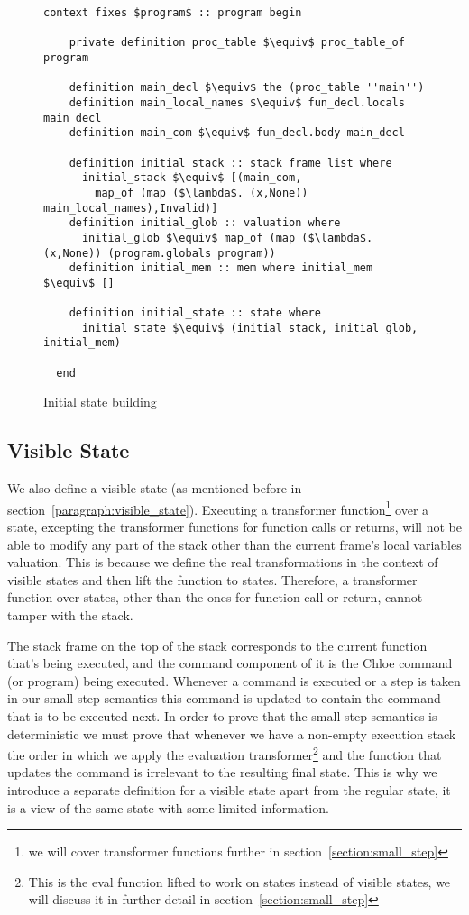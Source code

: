 \begin{figure}
  \begin{lstlisting}[frame=single, mathescape=true]
  context fixes $program$ :: program begin

    private definition proc_table $\equiv$ proc_table_of program

    definition main_decl $\equiv$ the (proc_table ''main'')
    definition main_local_names $\equiv$ fun_decl.locals main_decl
    definition main_com $\equiv$ fun_decl.body main_decl

    definition initial_stack :: stack_frame list where
      initial_stack $\equiv$ [(main_com,
        map_of (map ($\lambda$. (x,None)) main_local_names),Invalid)]
    definition initial_glob :: valuation where
      initial_glob $\equiv$ map_of (map ($\lambda$. (x,None)) (program.globals program))
    definition initial_mem :: mem where initial_mem $\equiv$ []

    definition initial_state :: state where
      initial_state $\equiv$ (initial_stack, initial_glob, initial_mem)

  end
  \end{lstlisting}

  \caption{Initial state building}
  \label{fig:init_state_building}
\end{figure}



\subsection{Visible State}\label{subsection:visible_state}
We also define a visible state (as mentioned before in section~\ref{paragraph:visible_state}).
Executing a transformer function\footnote{we will cover transformer functions further in section~\ref{section:small_step}} over a state, excepting the transformer functions for function calls or returns, will not be able to modify any part of the stack other than the current frame's local variables valuation.
This is because we define the real transformations in the context of visible states and then lift the function to states.
Therefore, a transformer function over states, other than the ones for function call or return, cannot tamper with the stack.

The stack frame on the top of the stack corresponds to the current function that's being executed, and the command component of it is the Chloe command (or program) being executed.
Whenever a command is executed or a step is taken in our small-step semantics this command is updated to contain the command that is to be executed next.
In order to prove that the small-step semantics is deterministic we must prove that whenever we have a non-empty execution stack the order in which we apply the evaluation transformer\footnote{This is the eval function lifted to work on states instead of visible states, we will discuss it in further detail in section~\ref{section:small_step}} and the function that updates the command is irrelevant to the resulting final state.
This is why we introduce a separate definition for a visible state apart from the regular state, it is a view of the same state with some limited information.

